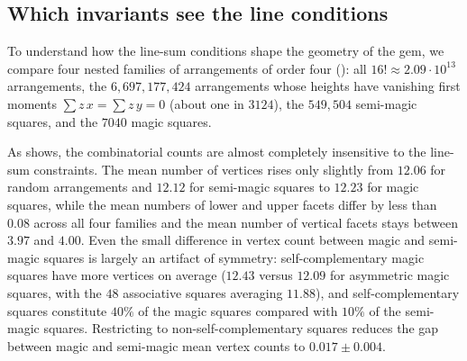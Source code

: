 \subsection{Which invariants see the line conditions}
\label{sec:magic-vs-random}

To understand how the line-sum conditions shape the geometry of the gem, we compare four nested families of arrangements of order four (): all $16!\approx2.09\cdot10^{13}$ arrangements, the $6{,}697{,}177{,}424$ arrangements whose heights have vanishing first moments $\sum z\,x=\sum z\,y=0$ (about one in $3124$), the $549{,}504$ semi-magic squares, and the $7040$ magic squares.

\begin{table}[htbp]
\centering
\caption{Mean invariants of the gems of order four across four nested families. The first three columns are estimates from $10^5$ uniform samples each (standard errors at most $0.006$ for the counts and fractions, $0.024$ for the volume and $0.001$ for the centroid): arbitrary arrangements, arrangements with vanishing first moments $\sum z\,x=\sum z\,y=0$ (rejection sampling), and semi-magic squares (uniform over all $549{,}504$). The magic column is exact over all $7040$ magic squares. The solid centroid is the centre of mass of the solid polytope $\mathcal G(S)$.}
\label{tab:magic-vs-random}
\scriptsize
\setlength{\tabcolsep}{6pt}

\end{table}

As  shows, the combinatorial counts are almost completely insensitive to the line-sum constraints.
The mean number of vertices rises only slightly from $12.06$ for random arrangements and $12.12$ for semi-magic squares to $12.23$ for magic squares, while the mean numbers of lower and upper facets differ by less than $0.08$ across all four families and the mean number of vertical facets stays between $3.97$ and $4.00$.
Even the small difference in vertex count between magic and semi-magic squares is largely an artifact of symmetry: self-complementary magic squares have more vertices on average ($12.43$ versus $12.09$ for asymmetric magic squares, with the $48$ associative squares averaging $11.88$), and self-complementary squares constitute $40\%$ of the magic squares compared with $10\%$ of the semi-magic squares. Restricting to non-self-complementary squares reduces the gap between magic and semi-magic mean vertex counts to $0.017\pm0.004$.

